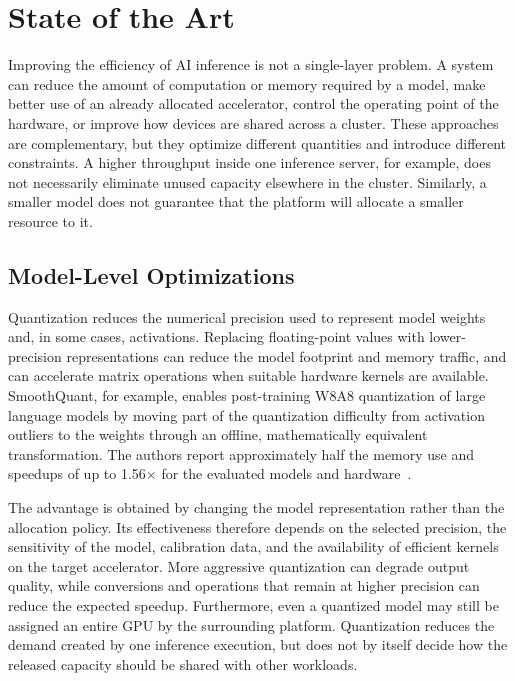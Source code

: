 \chapter{State of the Art}
\label{chap:state-of-the-art}

Improving the efficiency of AI inference is not a single-layer problem. A system can reduce the amount of computation or memory required by a model, make better use of an already allocated accelerator, control the operating point of the hardware, or improve how devices are shared across a cluster. These approaches are complementary, but they optimize different quantities and introduce different constraints. A higher throughput inside one inference server, for example, does not necessarily eliminate unused capacity elsewhere in the cluster. Similarly, a smaller model does not guarantee that the platform will allocate a smaller resource to it.

\section{Model-Level Optimizations}
\label{sec:sota-model-level}

Quantization reduces the numerical precision used to represent model weights and, in some cases, activations. Replacing floating-point values with lower-precision representations can reduce the model footprint and memory traffic, and can accelerate matrix operations when suitable hardware kernels are available. SmoothQuant, for example, enables post-training W8A8 quantization of large language models by moving part of the quantization difficulty from activation outliers to the weights through an offline, mathematically equivalent transformation. The authors report approximately half the memory use and speedups of up to 1.56$\times$ for the evaluated models and hardware~\cite{xiao2023smoothquant}.

The advantage is obtained by changing the model representation rather than the allocation policy. Its effectiveness therefore depends on the selected precision, the sensitivity of the model, calibration data, and the availability of efficient kernels on the target accelerator. More aggressive quantization can degrade output quality, while conversions and operations that remain at higher precision can reduce the expected speedup. Furthermore, even a quantized model may still be assigned an entire GPU by the surrounding platform. Quantization reduces the demand created by one inference execution, but does not by itself decide how the released capacity should be shared with other workloads.

